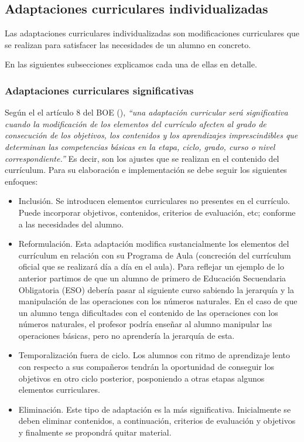 \subsection{Adaptaciones curriculares individualizadas}

Las adaptaciones curriculares individualizadas son modificaciones curriculares que se realizan para satisfacer las necesidades de un alumno en concreto.

En las siguientes subsecciones explicamos cada una de ellas en detalle.

\subsubsection{Adaptaciones curriculares significativas}
Según el el artículo 8 del BOE (\citeyear[p. 7]{BOE}), \textit{``una adaptación curricular será significativa cuando la modificación de los elementos del currículo afecten al grado de consecución de los objetivos, los contenidos y los aprendizajes imprescindibles que determinan las competencias básicas en la etapa, ciclo, grado, curso o nivel correspondiente.''} Es decir, son los ajustes que se realizan en el contenido del currículum. Para su elaboración e implementación se debe seguir los siguientes enfoques:
\begin{itemize}
    \item Inclusión. Se introducen elementos curriculares no presentes en el currículo. Puede incorporar objetivos, contenidos, criterios de evaluación, etc; conforme a las necesidades del alumno.
    \item Reformulación. Esta adaptación modifica sustancialmente los elementos del currículum en relación con su Programa de Aula (concreción del currículum oficial que se realizará día a día en el aula). Para reflejar un ejemplo de lo anterior partimos de que un alumno de primero de Educación Secuendaria Obligatoria (ESO) debería pasar al siguiente curso sabiendo la jerarquía y la manipulación de las operaciones con los números naturales. En el caso de que un alumno tenga dificultades con el contenido de las operaciones con los números naturales, el profesor podría enseñar al alumno manipular las operaciones básicas, pero no aprendería la jerarquía de esta.

    \item Temporalización fuera de ciclo. Los alumnos con ritmo de aprendizaje lento con respecto a sus compañeros tendrán la oportunidad de conseguir los objetivos en otro ciclo posterior, posponiendo a otras etapas algunos elementos curriculares.
    \item Eliminación. Este tipo de adaptación es la más significativa. Inicialmente se deben eliminar contenidos, a continuación, criterios de evaluación y objetivos y finalmente se propondrá quitar material.
\end{itemize}

